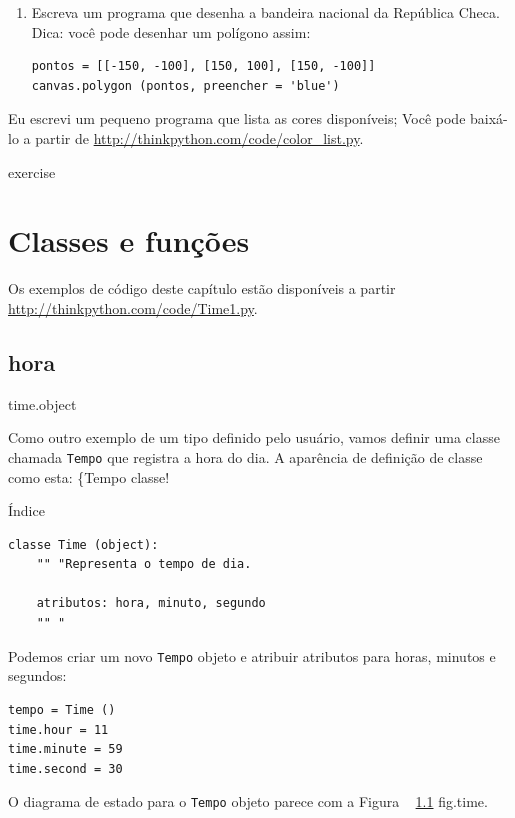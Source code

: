 \documentclass[10pt]{book}
\begin{document}
\begin{exercise}
\begin{v erbatim}
{\begin{}
\begin{enumerate}
\item Escreva um programa que desenha a bandeira nacional da República Checa.
Dica: você pode desenhar um polígono assim:

\begin{verbatim}
pontos = [[-150, -100], [150, 100], [150, -100]]
canvas.polygon (pontos, preencher = 'blue')
\end{verbatim}

\end{enumerate}

Eu escrevi um pequeno programa que lista as cores disponíveis;
Você pode baixá-lo a partir de \url{http://thinkpython.com/code/color_list.py}.

\end{} exercise


\chapter{Classes e funções}
\label{tempo}

Os exemplos de código deste capítulo estão disponíveis a partir
\url{http://thinkpython.com/code/Time1.py}.

\section{hora}
\label{} time.object

Como outro exemplo de um tipo definido pelo usuário, vamos definir uma classe chamada
{\tt Tempo} que registra a hora do dia. A aparência de definição de classe
como esta:
\{Tempo classe!} Índice

\begin{verbatim}
classe Time (object):
    "" "Representa o tempo de dia.
       
    atributos: hora, minuto, segundo
    "" "
\end{verbatim}
%
Podemos criar um novo {\tt Tempo} objeto e atribuir
atributos para horas, minutos e segundos:

\begin{verbatim}
tempo = Time ()
time.hour = 11
time.minute = 59
time.second = 30
\end{verbatim}
%
O diagrama de estado para o {\tt Tempo} objeto parece com a Figura ~ \ref {} fig.time.


\end{v erbatim}
\end{exercise}
\end{document}

